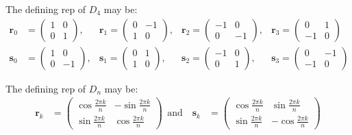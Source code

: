 \documentclass[]{ctexart}
\begin{document}
    The defining rep of $ D_4 $ may be:
    \begin{equation*}
    	\begin{aligned}
    	\mathbf{r}_{0} &=\left(\begin{array}{cc}
    	1 & 0 \\
    	0 & 1
    	\end{array}\right),& \mathbf{r}_{1}=\left(\begin{array}{cc}
    	0 & -1 \\
    	1 & 0
    	\end{array}\right),& \mathbf{r}_{2}=\left(\begin{array}{cc}
    	-1 & 0 \\
    	0 & -1
    	\end{array}\right),& \mathbf{r}_{3}=\left(\begin{array}{cc}
    	0 & 1 \\
    	-1 & 0
    	\end{array}\right) \\
    	\mathbf{s}_{0} &=\left(\begin{array}{cc}
    	1 & 0 \\
    	0 & -1
    	\end{array}\right),& \mathbf{s}_{1}=\left(\begin{array}{cc}
    	0 & 1 \\
    	1 & 0
    	\end{array}\right),& \mathbf{s}_{2}=\left(\begin{array}{cc}
    	-1 & 0 \\
    	0 & 1
    	\end{array}\right),& \mathbf{s}_{3}=\left(\begin{array}{cc}
    	0 & -1 \\
    	-1 & 0
    	\end{array}\right)
    	\end{aligned}
    \end{equation*}
    
    The defining rep of $ D_n $ may be:
    \begin{equation*}
    	\begin{aligned}\mathbf {r} _{k}&={\begin{pmatrix}\cos {\frac {2\pi k}{n}}&-\sin {\frac {2\pi k}{n}}\\\sin {\frac {2\pi k}{n}}&\cos {\frac {2\pi k}{n}}\end{pmatrix}}\ \ {\text{and}}\quad \mathbf {s} _{k}&={\begin{pmatrix}\cos {\frac {2\pi k}{n}}&\sin {\frac {2\pi k}{n}}\\\sin {\frac {2\pi k}{n}}&-\cos {\frac {2\pi k}{n}}\end{pmatrix}}\end{aligned}
    \end{equation*}
    
\end{document}
